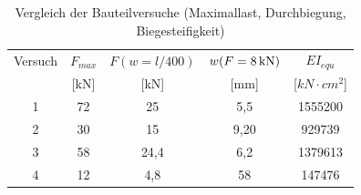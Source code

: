 \begin{table}[h]
\caption{Vergleich der Bauteilversuche (Maximallast, Durchbiegung, Biegesteifigkeit)}
\begin{center}
\begin{tabular}{|c|c|c|c|c|}
\hline 
Versuch & $F_{max}$  & $F(w=l/400)$ & $w(F=\unit[8]{kN})$ & $EI_{equ}$ \\ 

& [kN] & [kN] & [mm]   & [$\unit{kN \cdot cm^2}$] \\ 
\hline\hline
1 & 72 & 25 & 5,5 & 1555200  \\ 
\hline 
2  & 30 & 15 & 9,20 & 929739 \\ 
\hline 
3 & 58 & 24,4 & 6,2 & 1379613 \\ 
\hline 
4  & 12 & 4,8 & 58 & 147476 \\ 
\hline 
\end{tabular} 
\end{center}
\label{tab:vergleich_versuche}
\end{table}


